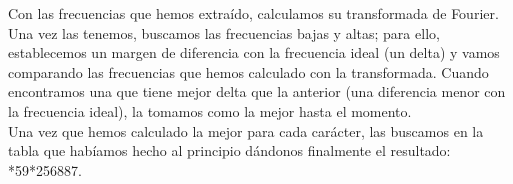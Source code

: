 \documentclass[11pt,a4paper]{article}
\begin{document}
Con las frecuencias que hemos extraído, calculamos su transformada de Fourier. Una vez las tenemos, buscamos las frecuencias bajas y altas; para ello, establecemos un margen de diferencia con la frecuencia ideal (un delta) y vamos comparando las frecuencias que hemos calculado con la transformada. Cuando encontramos una que tiene mejor delta que la anterior (una diferencia menor con la frecuencia ideal), la tomamos como la mejor hasta el momento.\\

Una vez que hemos calculado la mejor para cada carácter, las buscamos en la tabla que habíamos hecho al principio dándonos finalmente el resultado: *59*256887.
\end{document}
